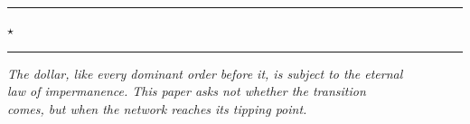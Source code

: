 \documentclass[12pt, letterpaper]{article}
\theoremstyle{definition}
\begin{document}
\vspace{1.8cm}

\begin{center}
\rule{0.45\linewidth}{0.4pt}\quad
{\large\textcolor{cgngold}{$\star$}}
\quad\rule{0.45\linewidth}{0.4pt}
\end{center}

\vspace{1.0cm}
\begin{center}
{\small\itshape
The dollar, like every dominant order before it, is subject to the eternal\\
law of impermanence. This paper asks not \textit{whether} the transition\\
comes, but \textit{when the network reaches its tipping point.}
}
\end{center}

\newpage
\setcounter{tocdepth}{3}
\tableofcontents
\newpage
\end{document}
